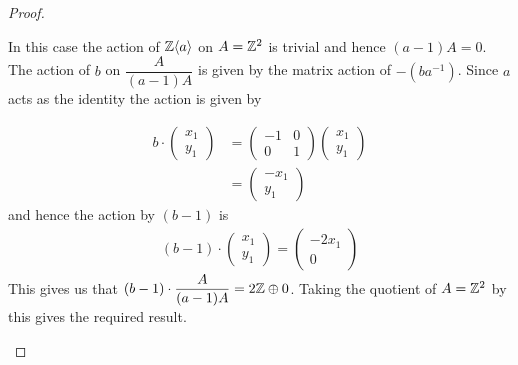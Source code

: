 \begin{proof}
    \begin{case}[Family 1]
        In this case the action of $\mathbb{Z}\langle a \rangle$ on $A = \mathbb{Z}^2$ is trivial and hence $(a-1)A = 0$. The action of
        $b$ on $\dfrac{A}{(a-1)A}$ is given by the matrix action of $-(ba^{-1})$. Since $a$ acts as the identity the action is given by

        \begin{align*}
            b \cdot \begin{pmatrix}
                        x_1 \\
                        y_1
                    \end{pmatrix} & = \begin{pmatrix}
                                          -1 & 0 \\
                                          0  & 1
                                      \end{pmatrix}\begin{pmatrix}
                                                       x_1 \\
                                                       y_1
                                                   \end{pmatrix} \\
                                    & =   \begin{pmatrix}
                                              -x_1 \\
                                              y_1
                                          \end{pmatrix}
        \end{align*}
        and hence the action by $(b-1)$ is
        \begin{align*}
            (b-1) \cdot \begin{pmatrix}
                            x_1 \\
                            y_1
                        \end{pmatrix} = \begin{pmatrix}
                                            -2x_1 \\
                                            0
                                        \end{pmatrix}
        \end{align*}
        This gives us that $(b-1)\cdot \dfrac{A}{(a-1)A} = 2\mathbb{Z} \oplus 0$. Taking the quotient of $A = \mathbb{Z}^2$ by this gives the required result.
    \end{case}


\end{proof}
